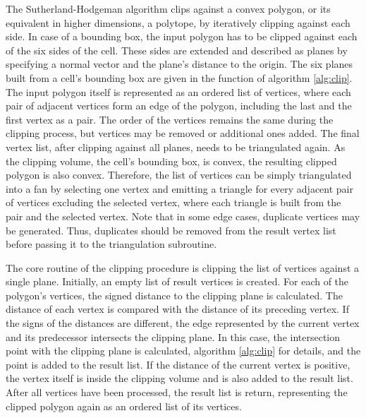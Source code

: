 The Sutherland-Hodgeman algorithm clips against a convex polygon, or its equivalent in higher dimensions, \ie a polytope, by iteratively clipping against each side.
In case of a bounding box, the input polygon has to be clipped against each of the six sides of the cell.
These sides are extended and described as planes by specifying a normal vector and the plane's distance to the origin.
The six planes built from a cell's bounding box are given in the  function of algorithm \ref{alg:clip}.
The input polygon itself is represented as an ordered list of vertices, where each pair of adjacent vertices form an edge of the polygon, including the last and the first vertex as a pair.
The order of the vertices remains the same during the clipping process, but vertices may be removed or additional ones added.
The final vertex list, after clipping against all planes, needs to be triangulated again.
As the clipping volume, \ie the cell's bounding box, is convex, the resulting clipped polygon is also convex.
Therefore, the list of vertices can be simply triangulated into a fan by selecting one vertex and emitting a triangle for every adjacent pair of vertices excluding the selected vertex, where each triangle is built from the pair and the selected vertex.
Note that in some edge cases, duplicate vertices may be generated.
Thus, duplicates should be removed from the result vertex list before passing it to the triangulation subroutine.

The core routine of the clipping procedure is clipping the list of vertices against a single plane.
Initially, an empty list of result vertices is created.
For each of the polygon's vertices, the signed distance to the clipping plane is calculated.
The distance of each vertex is compared with the distance of its preceding vertex.
If the signs of the distances are different, the edge represented by the current vertex and its predecessor intersects the clipping plane.
In this case, the intersection point with the clipping plane is calculated, \cf algorithm \ref{alg:clip} for details, and the point is added to the result list.
If the distance of the current vertex is positive, the vertex itself is inside the clipping volume and is also added to the result list.
After all vertices have been processed, the result list is return, representing the clipped polygon again as an ordered list of its vertices.

